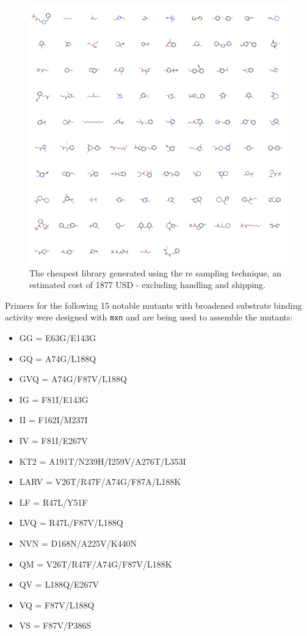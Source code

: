 \documentclass{article}
\begin{document}
\begin{figure}[t]
	\caption{\label{lib} The cheapest library generated using the re sampling technique, an estimated cost of 1877 USD - excluding handling and shipping. }
	\includegraphics[width=\linewidth]{figs/s979.csv.png}
\end{figure}

\par
Primers for the following 15 notable mutants with broadened substrate binding activity \cite{whitehouse2012p450} were designed with \texttt{mxn} and are being used to assemble the mutants:

\begin{itemize}
  \item GG = E63G/E143G 
  \item GQ = A74G/L188Q 
  \item GVQ = A74G/F87V/L188Q 
  \item IG = F81I/E143G 
  \item II = F162I/M237I 
  \item IV = F81I/E267V 
  \item KT2 = A191T/N239H/I259V/A276T/L353I 
  \item LARV = V26T/R47F/A74G/F87A/L188K 
  \item LF = R47L/Y51F 
  \item LVQ = R47L/F87V/L188Q 
  \item NVN = D168N/A225V/K440N 
  \item QM = V26T/R47F/A74G/F87V/L188K 
  \item QV = L188Q/E267V 
  \item VQ = F87V/L188Q 
  \item VS = F87V/P386S
\end{itemize}
\end{document}
